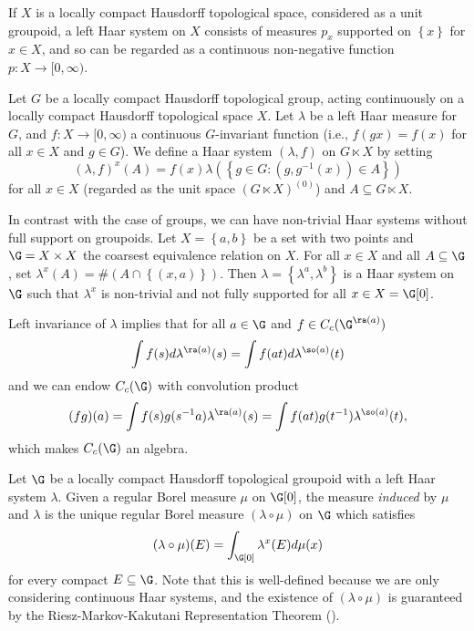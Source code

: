 \begin{example}
If $X$ is a locally compact Hausdorff topological space, considered as a unit groupoid, a left Haar system on $X$ consists of measures $p_x$ supported on $\left\{x\right\}$ for $x\in X$, and so can be regarded as a continuous non-negative function $p:X\to[0,\infty)$.
\end{example}

\begin{example}\label{examplehaarsystemfxandhaarmeasure}
Let $G$ be a locally compact Hausdorff topological group, acting continuously on a locally compact Hausdorff topological space $X$. Let $\lambda$ be a left Haar measure for $G$, and $f:X\to[0,\infty)$ a continuous $G$-invariant function (i.e., $f(gx)=f(x)$ for all $x\in X$ and $g\in G$). We define a Haar system $(\lambda,f)$ on $G\ltimes X$ by setting
\[(\lambda,f)^x(A)=f(x)\lambda\left(\left\{g\in G:(g,g^{-1}(x))\in A\right\}\right)\]
for all $x\in X$ (regarded as the unit space $(G\ltimes X)^{(0)}$) and $A\subseteq G\ltimes X$.
\end{example}

\begin{example}
In contrast with the case of groups, we can have non-trivial Haar systems without full support on groupoids. Let $X=\left\{a,b\right\}$ be a set with two points and $\G=X\times X$ the coarsest equivalence relation on $X$. For all $x\in X$ and all $A\subseteq\G$, set $\lambda^x(A)=\#(A\cap\left\{(x,a)\right\})$. Then $\lambda=\left\{\lambda^a,\lambda^b\right\}$ is a Haar system on $\G$ such that $\lambda^x$ is non-trivial and not fully supported for all $x\in X=\G[0]$.
\end{example}

Left invariance of $\lambda$ implies that for all $a\in\G$ and $f\in C_c(\G^{\ra(a)})$
\[\int f(s)d\lambda^{\ra(a)}(s)=\int f(at)d\lambda^{\so(a)}(t)\]
and we can endow $C_c(\G)$ with convolution product
\[(fg)(a)=\int f(s)g(s^{-1}a)\lambda^{\ra(a)}(s)=\int f(at)g(t^{-1})\lambda^{\so(a)}(t),\]
which makes $C_c(\G)$ an algebra.

\begin{definition}
Let $\G$ be a locally compact Hausdorff topological groupoid with a left Haar system $\lambda$. Given a regular Borel measure $\mu$ on $\G[0]$, the measure \emph{induced} by $\mu$ and $\lambda$ is the unique regular Borel measure $(\lambda\circ\mu)$ on $\G$ which satisfies
\[(\lambda\circ\mu)(E)=\int_{\G[0]}\lambda^x(E)d\mu(x)\]
for every compact $E\subseteq\G$. Note that this is well-defined because we are only considering continuous Haar systems, and the existence of $(\lambda\circ\mu)$ is guaranteed by the Riesz-Markov-Kakutani Representation Theorem (\cite[Theorem 2.14]{MR924157}).%
\end{definition}

